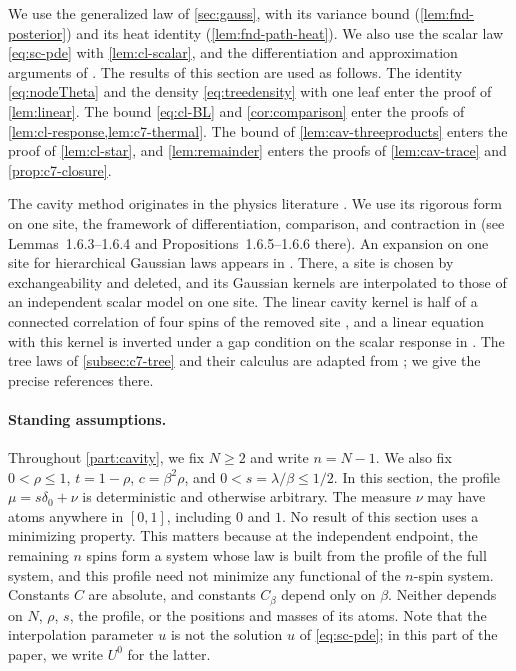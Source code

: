 We use the generalized law of \cref{sec:gauss}, with its variance bound
(\cref{lem:fnd-posterior}) and its heat identity
(\cref{lem:fnd-path-heat}). We also use the scalar law \eqref{eq:sc-pde}
with \cref{lem:cl-scalar}, and the differentiation and approximation
arguments of \cite[Sections~2.1, 2.3, and~2.6]{AL}. The results of this
section are used as follows. The identity \eqref{eq:nodeTheta} and the
density \eqref{eq:treedensity} with one leaf enter the proof of
\cref{lem:linear}. The bound \eqref{eq:cl-BL} and \cref{cor:comparison}
enter the proofs of \cref{lem:cl-response,lem:c7-thermal}. The bound of
\cref{lem:cav-threeproducts} enters the proof of \cref{lem:cl-star}, and
\cref{lem:remainder} enters the proofs of \cref{lem:cav-trace} and
\cref{prop:c7-closure}.

The cavity method originates in the physics literature
\cite{MezardParisiVirasoro1986,MezardParisiVirasoro1987}. We use its rigorous form on
one site, the framework of differentiation, comparison, and contraction in
\cite[Section~1.6]{TalagrandVolI2011} (see Lemmas~1.6.3--1.6.4 and
Propositions~1.6.5--1.6.6 there). An expansion on one site for
hierarchical Gaussian laws appears in \cite[Lemma~2.2]{OpenAILimitingLaw}.
There, a site is chosen by exchangeability and deleted, and its Gaussian
kernels are interpolated to those of an independent scalar model on one
site. The linear cavity kernel is half of a connected correlation of four
spins of the removed site \cite[(A8)]{OpenAILimitingLaw}, and a linear
equation with this kernel is inverted under a gap condition on the scalar
response in \cite[Proposition~5.1]{OpenAILimitingLaw}. The tree laws of
\cref{subsec:c7-tree} and their calculus are adapted from
\cite[Section~2]{OpenAIFluctuationScale}; we give the precise references
there.

\paragraph{Standing assumptions.}
Throughout \cref{part:cavity}, we fix $N\ge2$ and write $n=N-1$. We also
fix $0<\rho\le1$, $t=1-\rho$, $c=\beta^2\rho$, and
$0<s=\lambda/\beta\le1/2$. In this section, the profile
$\mu=s\delta_0+\nu$ is deterministic and otherwise arbitrary. The measure
$\nu$ may have atoms anywhere in $[0,1]$, including $0$ and $1$. No result
of this section uses a minimizing property. This matters because at the
independent endpoint, the remaining $n$ spins form a system whose law is
built from the profile of the full system, and this profile need not
minimize any functional of the $n$-spin system. Constants $C$ are absolute, and
constants $C_\beta$ depend only on $\beta$. Neither depends on $N$,
$\rho$, $s$, the profile, or the positions and masses of its atoms. Note
that the interpolation parameter $u$ is not the solution $u$ of
\eqref{eq:sc-pde}; in this part of the paper, we write $U^0$ for the
latter.

